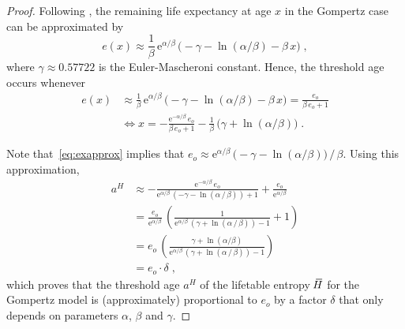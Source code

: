 \documentclass[a4paper,twoside, openright, 12pt, leqno]{article}
\newcommand*\xbar[1]{%
   \hbox{%
     \vbox{%
       \hrule height 0.5pt %
       \kern0.3ex%
       \hbox{%
         \kern-0.28em%
         \ensuremath{#1}%
         \kern-0.05em%
       }%
     }%
   }%
}
\begin{document}
\begin{proof}
Following \citet{missov2013gompertz}, the remaining life expectancy at age $x$ in the Gompertz case can be approximated by
%
\begin{equation}
  e(x)\approx\frac{1}{\beta}\,\mathrm{e}^{\alpha/\beta}\,\big(-\gamma-\ln(\alpha/\beta)-\beta\,x\big)\;,
  \label{eq:exapprox}
\end{equation}
%
where $\gamma\approx 0.57722$ is the Euler-Mascheroni constant. Hence, the threshold age occurs whenever
%
\begin{equation*}
\begin{split}
e(x)	& \approx\frac{1}{\beta}\,\mathrm{e}^{\alpha/\beta}\,\big(-\gamma-\ln(\alpha/\beta)-\beta\,x\big)=\frac{e_o}{\beta\,e_o+1}			\\
& \Longleftrightarrow x=-\frac{\mathrm{e}^{-\alpha/\beta}\,e_o}{\beta\,e_o+1}-\frac{1}{\beta}\,\big(\gamma+\ln(\alpha/\beta)\big)\;.
\end{split}
\end{equation*}

Note that~\eqref{eq:exapprox} implies that $e_o\approx \mathrm{e}^{\alpha/\beta}\,\big(-\gamma-\ln(\alpha/\beta)\big)\,/\,\beta$. Using this approximation,
%
\begin{equation}
  \begin{split}
 	a^H & \approx -\frac{\mathrm{e}^{-\alpha/\beta}\,e_o}{\mathrm{e}^{\alpha/\beta}\,\left(-\gamma-\ln\left(\alpha\,/\,\beta\right)\right)+1}+\frac{e_o}{\mathrm{e}^{\alpha/\beta}}	\\
 	& = \frac{e_o}{\mathrm{e}^{\alpha/\beta}}\,\left(\frac{1}{\mathrm{e}^{\alpha/\beta}\,( \gamma+\ln\left(\alpha\,/\,\beta\right))-1}+1\right)	 \\
 	& = e_o\,\left(\frac{\gamma+\ln(\alpha/\beta)}{\mathrm{e}^{\alpha/\beta}\,( \gamma+\ln\left(\alpha\,/\,\beta\right))-1}\right)			 \\
 	& = e_o \cdot \delta\;,
  \end{split}
  \label{eq.x}
\end{equation}
%
which proves that the threshold age $a^H$ of the lifetable entropy $\,\xbar{H}$ for the Gompertz model is (approximately) proportional to $e_o$ by a factor $\delta$ that only depends on parameters $\alpha$, $\beta$ and $\gamma$.
\end{proof}
\end{document}
